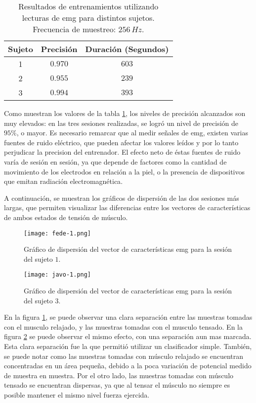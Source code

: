\begin{table}[H]
\centering
\begin{tabular}{ |c|c|c| } 
 \hline
 Sujeto & Precisión & Duración (Segundos) \\ 
 \hline
 1 & $0.970$ & $603$ \\
  \hline
 2 & $0.955$ & $239$ \\
  \hline
 3 & $0.994$ & $393$ \\

 \hline
\end{tabular}
\caption{Resultados de entrenamientos utilizando lecturas de \acrshort{emg} para distintos sujetos. Frecuencia de muestreo: $256\,Hz$.}
\label{tab:emg-results}
\end{table}

Como muestran los valores de la tabla \ref{tab:emg-results}, los niveles de precisión alcanzados son muy elevados: en las tres sesiones realizadas, se logró un nivel de precisión de $95\%$, o mayor. Es necesario remarcar que al medir señales de \acrshort{emg}, existen varias fuentes de ruido eléctrico, que pueden afectar los valores leídos y por lo tanto perjudicar la precision del entrenador. El efecto neto de éstas fuentes de ruido varía de sesión en sesión, ya que depende de factores como la cantidad de movimiento de los electrodos en relación a la piel, o la presencia de dispositivos que emitan radiación electromagnética\cite{emg-delsys}.

A continuación, se muestran los gráficos de dispersión de las dos sesiones más largas, que permiten visualizar las diferencias entre los vectores de características de ambos estados de tensión de músculo.

 \begin{figure}[H]
	\centering
    \texttt{[image: fede-1.png]}
    \caption{Gráfico de dispersión del vector de características \acrshort{emg} para la sesión del sujeto $1$.}
	\label{fig:emg-graph-s1}
\end{figure}

 \begin{figure}[H]
	\centering
    \texttt{[image: javo-1.png]}
    \caption{Gráfico de dispersión del vector de características \acrshort{emg} para la sesión del sujeto $3$.}
	\label{fig:emg-graph-s3}
\end{figure}

En la figura \ref{fig:emg-graph-s1}, se puede observar una clara separación entre las muestras tomadas con el musculo relajado, y las muestras tomadas con el musculo tensado. En la figura \ref{fig:emg-graph-s3} se puede observar el mismo efecto, con una separación aun mas marcada. Esta clara separación fue la que permitió utilizar un clasificador simple. También, se puede notar como las muestras tomadas con músculo relajado se encuentran concentradas en un área pequeña, debido a la poca variación de potencial medido de muestra en muestra. Por el otro lado, las muestras tomadas con músculo tensado se encuentran dispersas, ya que al tensar el músculo no siempre es posible mantener el mismo nivel fuerza ejercida.

